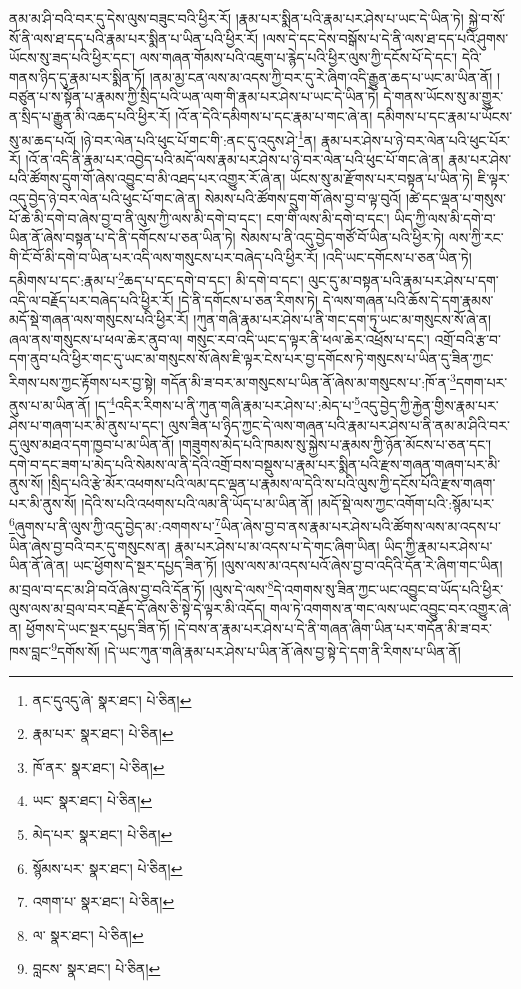 ནམ་མ་ཤི་བའི་བར་དུ་དེས་ལུས་བཟུང་བའི་ཕྱིར་རོ། །རྣམ་པར་སྨིན་པའི་རྣམ་པར་ཤེས་པ་ཡང་དེ་ཡིན་ཏེ། སྐྱེ་བ་སོ་སོ་ནི་ལས་ཐ་དད་པའི་རྣམ་པར་སྨིན་པ་ཡིན་པའི་ཕྱིར་རོ། །ལས་དེ་དང་དེས་བསྒོས་པ་དེ་ནི་ལས་ཐ་དད་པའི་ཤུགས་ཡོངས་སུ་ཟད་པའི་ཕྱིར་དང་། ལས་གཞན་གོམས་པའི་འཇུག་པ་རྙེད་པའི་ཕྱིར་ལུས་ཀྱི་དངོས་པོ་དེ་དང་། དེའི་གནས་ཉིད་དུ་རྣམ་པར་སྨིན་ཏོ། །ནམ་མྱ་ངན་ལས་མ་འདས་ཀྱི་བར་དུ་རེ་ཞིག་འདི་རྒྱུན་ཆད་པ་ཡང་མ་ཡིན་ནོ། །བཙུན་པ་ས་སྟོན་པ་རྣམས་ཀྱི་སྲིད་པའི་ཡན་ལག་གི་རྣམ་པར་ཤེས་པ་ཡང་དེ་ཡིན་ཏེ། དེ་གནས་ཡོངས་སུ་མ་གྱུར་ན་སྲིད་པ་རྒྱུན་མི་འཆད་པའི་ཕྱིར་རོ། །འོ་ན་དེའི་དམིགས་པ་དང་རྣམ་པ་གང་ཞེ་ན། དམིགས་པ་དང་རྣམ་པ་ཡོངས་སུ་མ་ཆད་པའོ། །ཉེ་བར་ལེན་པའི་ཕུང་པོ་གང་གི་:ནང་དུ་འདུས་ཤེ་\footnote{ནང་དུའདུ་ཞེ་  སྣར་ཐང་།  པེ་ཅིན། }ན། རྣམ་པར་ཤེས་པ་ཉེ་བར་ལེན་པའི་ཕུང་པོར་རོ། །འོ་ན་འདི་ནི་རྣམ་པར་འབྱེད་པའི་མདོ་ལས་རྣམ་པར་ཤེས་པ་ཉེ་བར་ལེན་པའི་ཕུང་པོ་གང་ཞེ་ན། རྣམ་པར་ཤེས་པའི་ཚོགས་དྲུག་གོ་ཞེས་འབྱུང་བ་མི་འཐད་པར་འགྱུར་རོ་ཞེ་ན། ཡོངས་སུ་མ་རྫོགས་པར་བསྟན་པ་ཡིན་ཏེ། ཇི་ལྟར་འདུ་བྱེད་ཉེ་བར་ལེན་པའི་ཕུང་པོ་གང་ཞེ་ན། སེམས་པའི་ཚོགས་དྲུག་གོ་ཞེས་བྱ་བ་ལྟ་བུའོ། །ཚེ་དང་ལྡན་པ་གསུས་པོ་ཆེ་མི་དགེ་བ་ཞེས་བྱ་བ་ནི་ལུས་ཀྱི་ལས་མི་དགེ་བ་དང་། ངག་གི་ལས་མི་དགེ་བ་དང་། ཡིད་ཀྱི་ལས་མི་དགེ་བ་ཡིན་ནོ་ཞེས་བསྟན་པ་དེ་ནི་དགོངས་པ་ཅན་ཡིན་ཏེ། སེམས་པ་ནི་འདུ་བྱེད་གཙོ་བོ་ཡིན་པའི་ཕྱིར་ཏེ། ལས་ཀྱི་རང་གི་ངོ་བོ་མི་དགེ་བ་ཡིན་པར་འདི་ལས་གསུངས་པར་བཞེད་པའི་ཕྱིར་རོ། །འདི་ཡང་དགོངས་པ་ཅན་ཡིན་ཏེ། དམིགས་པ་དང་:རྣམ་པ་\footnote{རྣམ་པར་  སྣར་ཐང་།  པེ་ཅིན། }ཆད་པ་དང་དགེ་བ་དང་། མི་དགེ་བ་དང་། ལུང་དུ་མ་བསྟན་པའི་རྣམ་པར་ཤེས་པ་དག་འདི་ལ་བརྗོད་པར་བཞེད་པའི་ཕྱིར་རོ། །དེ་ནི་དགོངས་པ་ཅན་རིགས་ཏེ། དེ་ལས་གཞན་པའི་ཆོས་དེ་དག་རྣམས་མདོ་སྡེ་གཞན་ལས་གསུངས་པའི་ཕྱིར་རོ། །ཀུན་གཞི་རྣམ་པར་ཤེས་པ་ནི་གང་དག་ཏུ་ཡང་མ་གསུངས་སོ་ཞེ་ན། ཞལ་ནས་གསུངས་པ་ཕལ་ཆེར་ནུབ་ལ། གསུང་རབ་འདི་ཡང་ད་ལྟར་ནི་ཕལ་ཆེར་འཕྲོས་པ་དང་། འགྲོ་བའི་རྩ་བ་དག་ནུབ་པའི་ཕྱིར་གང་དུ་ཡང་མ་གསུངས་སོ་ཞེས་ཇི་ལྟར་ངེས་པར་བྱ་དགོངས་ཏེ་གསུངས་པ་ཡིན་དུ་ཟིན་ཀྱང་རིགས་པས་ཀྱང་རྟོགས་པར་བྱ་སྟེ། གདོན་མི་ཟ་བར་མ་གསུངས་པ་ཡིན་ནོ་ཞེས་མ་གསུངས་པ་:ཁོ་ན་\footnote{ཁོ་ནར་  སྣར་ཐང་།  པེ་ཅིན། }དགག་པར་ནུས་པ་མ་ཡིན་ནོ། །ད་\footnote{ཡང་  སྣར་ཐང་།  པེ་ཅིན། }འདིར་རིགས་པ་ནི་ཀུན་གཞི་རྣམ་པར་ཤེས་པ་:མེད་པ་\footnote{མེད་པར་  སྣར་ཐང་།  པེ་ཅིན། }འདུ་བྱེད་ཀྱི་རྐྱེན་གྱིས་རྣམ་པར་ཤེས་པ་གཞག་པར་མི་ནུས་པ་དང་། ལུས་ཟིན་པ་ཉིད་ཀྱང་དེ་ལས་གཞན་པའི་རྣམ་པར་ཤེས་པ་ནི་ནམ་མ་ཤིའི་བར་དུ་ལུས་མཐའ་དག་ཁྱབ་པ་མ་ཡིན་ནོ། །གཟུགས་མེད་པའི་ཁམས་སུ་སྐྱེས་པ་རྣམས་ཀྱི་ཉོན་མོངས་པ་ཅན་དང་། དགེ་བ་དང་ཟག་པ་མེད་པའི་སེམས་ལ་ནི་དེའི་འགྲོ་བས་བསྡུས་པ་རྣམ་པར་སྨིན་པའི་རྫས་གཞན་གཞག་པར་མི་ནུས་སོ། །སྲིད་པའི་རྩེ་མོར་འཕགས་པའི་ལམ་དང་ལྡན་པ་རྣམས་ལ་དེའི་ས་པའི་ལུས་ཀྱི་དངོས་པོའི་རྫས་གཞག་པར་མི་ནུས་སོ། །དེའི་ས་པའི་འཕགས་པའི་ལམ་ནི་ཡོད་པ་མ་ཡིན་ནོ། །མདོ་སྡེ་ལས་ཀྱང་འགོག་པའི་:སྙོམ་པར་\footnote{སྙོམས་པར་  སྣར་ཐང་།  པེ་ཅིན། }ཞུགས་པ་ནི་ལུས་ཀྱི་འདུ་བྱེད་མ་:འགགས་པ་\footnote{འགག་པ་  སྣར་ཐང་།  པེ་ཅིན། }ཡིན་ཞེས་བྱ་བ་ནས་རྣམ་པར་ཤེས་པའི་ཚོགས་ལས་མ་འདས་པ་ཡིན་ཞེས་བྱ་བའི་བར་དུ་གསུངས་ན། རྣམ་པར་ཤེས་པ་མ་འདས་པ་དེ་གང་ཞིག་ཡིན། ཡིད་ཀྱི་རྣམ་པར་ཤེས་པ་ཡིན་ནོ་ཞེ་ན། ཡང་ཕྱོགས་དེ་སྔར་དཔྱད་ཟིན་ཏོ། །ལུས་ལས་མ་འདས་པའོ་ཞེས་བྱ་བ་འདིའི་དོན་རེ་ཞིག་གང་ཡིན། མ་བྲལ་བ་དང་མ་ཤི་བའོ་ཞེས་བྱ་བའི་དོན་ཏོ། །ལུས་དེ་ལས་\footnote{ལ་  སྣར་ཐང་།  པེ་ཅིན། }དེ་འགགས་སུ་ཟིན་ཀྱང་ཡང་འབྱུང་བ་ཡོད་པའི་ཕྱིར་ལུས་ལས་མ་བྲལ་བར་བརྗོད་དོ་ཞེས་ཅི་སྟེ་དེ་ལྟར་མི་འདོད། གལ་ཏེ་འགགས་ན་གང་ལས་ཡང་འབྱུང་བར་འགྱུར་ཞེ་ན། ཕྱོགས་དེ་ཡང་སྔར་དཔྱད་ཟིན་ཏོ། །དེ་བས་ན་རྣམ་པར་ཤེས་པ་དེ་ནི་གཞན་ཞིག་ཡིན་པར་གདོན་མི་ཟ་བར་ཁས་བླང་\footnote{བླངས་  སྣར་ཐང་།  པེ་ཅིན། }དགོས་སོ། །དེ་ཡང་ཀུན་གཞི་རྣམ་པར་ཤེས་པ་ཡིན་ནོ་ཞེས་བྱ་སྟེ་དེ་དག་ནི་རིགས་པ་ཡིན་ནོ། 